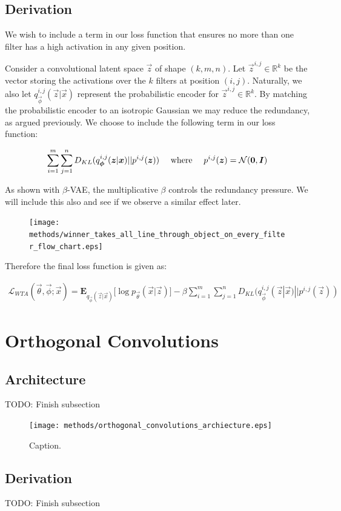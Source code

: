 \subsection{Derivation}

We wish to include a term in our loss function that ensures no more than one filter has a high activation in any given position.

Consider a convolutional latent space $\vec{z}$ of shape $(k, m, n)$. Let $\vec{z}^{i,j} \in \mathbb{R}^k$ be the vector storing the activations over the $k$ filters at position $(i, j)$. Naturally, we also let $q_{\vec{\phi}}^{i, j}(\vec{z} | \vec{x})$ represent the probabilistic encoder for $\vec{z}^{i,j}\in \mathbb{R}^k$. By matching the probabilistic encoder to an isotropic Gaussian we may reduce the redundancy, as argued previously. We choose to include the following term in our loss function:

\begin{align}
\sum_{i=1}^m \sum_{j=1}^n D_{KL}(q_{\vec{\phi}}^{i, j}(\vec{z} | \vec{x}) || p^{i,j}(\vec{z}))  \quad \textup{ where } \quad p^{i,j}(\vec{z}) = \mathcal{N}(\vec{0}, \vec{I})
\end{align}

As shown with $\beta$-VAE, the multiplicative $\beta$ controls the redundancy pressure. We will include this also and see if we observe a similar effect later.

\begin{figure}[h!]
\centering
\captionsetup{justification=centering}
\texttt{[image: methods/winner\_takes\_all\_line\_through\_object\_on\_every\_filter\_flow\_chart.eps]}
\label{fig:winner_takes_all_line_through_object_on_every_filter}
\end{figure}

Therefore the final loss function is given as:

\begin{align}
\mathcal{L}_{WTA}(\vec{\theta}, \vec{\phi}; \vec{x}) = \mathbf{E}_{q_{\vec{\phi}}(\vec{z} | \vec{x})} \big[ \log p_{\vec{\theta}}(\vec{x} | \vec{z}) \big] - \beta \sum_{i=1}^m \sum_{j=1}^n D_{KL}(q_{\vec{\phi}}^{i, j}(\vec{z} | \vec{x}) || p^{i,j}(\vec{z})) 
\end{align}


%
%
%
%
%
\section{Orthogonal Convolutions}
\lipsum[2]
\subsection{Architecture}
TODO: Finish subsection
\begin{figure}[h!]
\centering
\captionsetup{justification=centering}
\texttt{[image: methods/orthogonal\_convolutions\_archiecture.eps]}
\caption{Caption.}
\label{fig:orthogonal_convolutions_archiecture}
\end{figure}

\subsection{Derivation}
TODO: Finish subsection